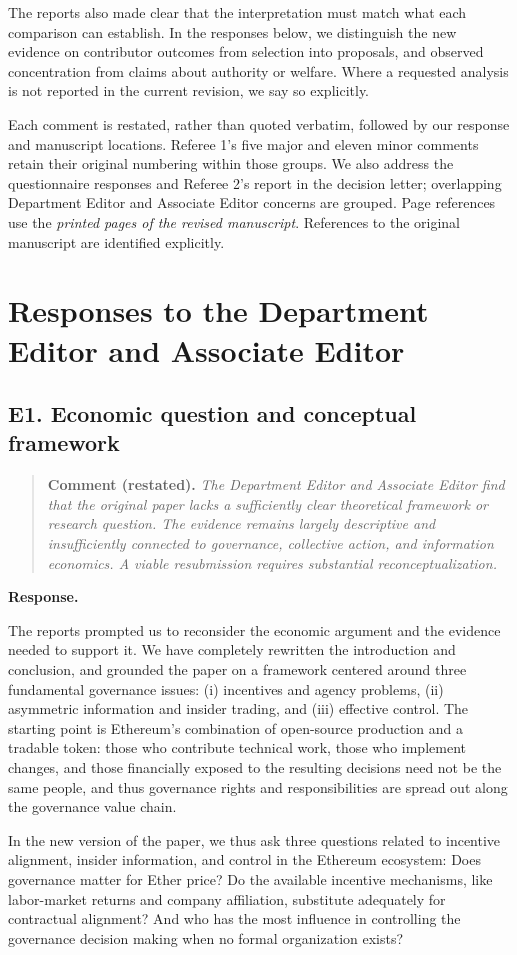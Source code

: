 \documentclass[11pt,letterpaper]{article}
\newcommand{\point}[3]{%
  \Needspace{7\baselineskip}
  \subsection*{#1. #2}\phantomsection\label{pt:#1}%
  \begin{quote}\small\textbf{Comment (restated).} \textit{#3}\end{quote}%
  \textbf{Response.}\enspace\ignorespaces}
\begin{document}
The reports also made clear that the interpretation must match what each comparison can establish. In the responses below, we distinguish the new evidence on contributor outcomes from selection into proposals, and observed concentration from claims about authority or welfare. Where a requested analysis is not reported in the current revision, we say so explicitly.

Each comment is restated, rather than quoted verbatim, followed by our response and manuscript locations. Referee 1's five major and eleven minor comments retain their original numbering within those groups. We also address the questionnaire responses and Referee 2's report in the decision letter; overlapping Department Editor and Associate Editor concerns are grouped. Page references use the \emph{printed pages of the revised manuscript}. References to the original manuscript are identified explicitly.

\section*{Responses to the Department Editor and Associate Editor}

\point{E1}{Economic question and conceptual framework}{The Department Editor and Associate Editor find that the original paper lacks a sufficiently clear theoretical framework or research question. The evidence remains largely descriptive and insufficiently connected to governance, collective action, and information economics. A viable resubmission requires substantial reconceptualization.}

The reports prompted us to reconsider the economic argument and the evidence needed to support it. We have completely rewritten the introduction and conclusion, and grounded the paper on a framework centered around three fundamental governance issues: (i) incentives and agency problems, (ii) asymmetric information and insider trading, and (iii) effective control. The starting point is Ethereum's combination of open-source production and a tradable token: those who contribute technical work, those who implement changes, and those financially exposed to the resulting decisions need not be the same people, and thus governance rights and responsibilities are spread out along the governance value chain. 

In the new version of the paper, we thus ask three questions related to incentive alignment, insider information, and control in the Ethereum ecosystem: Does governance matter for Ether price? Do the available incentive mechanisms, like labor-market returns and company
affiliation, substitute adequately for contractual alignment? And who has the most influence in controlling the governance decision making when no formal organization exists? 
\end{document}
